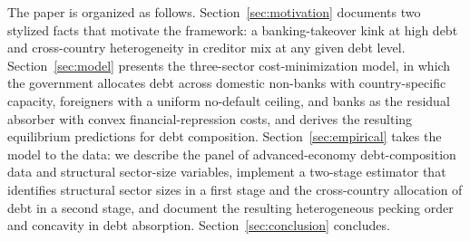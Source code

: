 \documentclass[\latexroot/\projectname]{subfiles}
\begin{document}
The paper is organized as follows. Section~\ref{sec:motivation} documents two stylized facts that motivate the framework: a banking-takeover kink at high debt and cross-country heterogeneity in creditor mix at any given debt level. Section~\ref{sec:model} presents the three-sector cost-minimization model, in which the government allocates debt across domestic non-banks with country-specific capacity, foreigners with a uniform no-default ceiling, and banks as the residual absorber with convex financial-repression costs, and derives the resulting equilibrium predictions for debt composition. Section~\ref{sec:empirical} takes the model to the data: we describe the panel of advanced-economy debt-composition data and structural sector-size variables, implement a two-stage estimator that identifies structural sector sizes in a first stage and the cross-country allocation of debt in a second stage, and document the resulting heterogeneous pecking order and concavity in debt absorption. Section~\ref{sec:conclusion} concludes.

\smartbib
\end{document}
